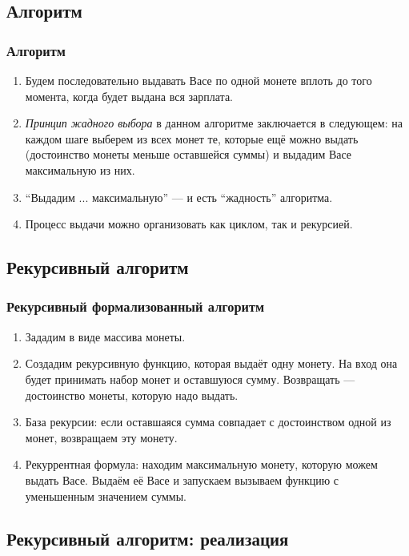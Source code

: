 \documentclass[compress,red]{beamer}
\begin{document}
\subsection{Алгоритм}
\begin{frame}[fragile]
\frametitle{Алгоритм}
	\begin{enumerate}
		\item Будем последовательно выдавать Васе по одной монете вплоть до того момента, когда будет выдана вся зарплата.
		\item \emph{Принцип жадного выбора} в данном алгоритме заключается в следующем: на каждом шаге выберем из всех монет те, которые ещё можно выдать (достоинство монеты меньше оставшейся суммы) и выдадим Васе максимальную из них.
		\item ``Выдадим ... максимальную'' --- и есть ``жадность'' алгоритма.
		\item Процесс выдачи можно организовать как циклом, так и рекурсией.
	\end{enumerate}
\end{frame}

\subsection{Рекурсивный алгоритм}
\begin{frame}[fragile]
  \frametitle{Рекурсивный формализованный алгоритм}
	\begin{enumerate}
		\item Зададим в виде массива монеты.
		\item Создадим рекурсивную функцию, которая выдаёт одну монету. На вход она будет принимать набор монет и оставшуюся сумму. Возвращать --- достоинство монеты, которую надо выдать. 
		\item База рекурсии: если оставшаяся сумма совпадает с достоинством одной из монет, возвращаем эту монету.
		\item Рекуррентная формула: находим максимальную монету, которую можем выдать Васе. Выдаём её Васе и запускаем вызываем функцию с уменьшенным значением суммы.
	\end{enumerate}
\end{frame}

\subsection{Рекурсивный алгоритм: реализация}
\begin{frame}[fragile]
  \frametitle{Реализация рекурсии}
  \scriptsize{
  \begin{lstlisting}[label=ruby1,language=ruby,caption=Монеты рекурсией]
		def give_coin(coins, n)
		  if coins.include?(n)
		    puts n
		  else
		    max = coins.find_all{|elem| elem < n}.max
		    puts max
		    give_coin(coins, n-max)
		  end
		end

		coins = [1,2,5,10,20,50,100]
		n = 398 
		give_coin(coin, n)
  \end{lstlisting}}}
  
\end{frame}
\end{document}
